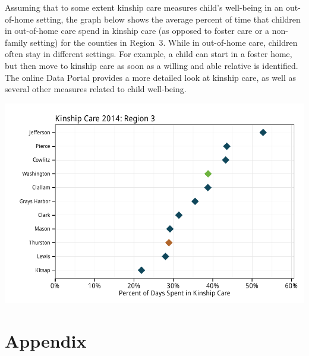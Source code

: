 \documentclass{article}\usepackage[]{graphicx}\usepackage[]{color}
\makeatletter
\def\maxwidth{ %
  \ifdim\Gin@nat@width>\linewidth
    \linewidth
  \else
    \Gin@nat@width
  \fi
}
\newenvironment{knitrout}{}{} %
\makeatother
\begin{document}
Assuming that to some extent kinship care measures child's well-being in an out-of-home setting, the graph below shows the average percent of time that children in out-of-home care spend in kinship care (as opposed to foster care or a non-family setting) for the counties in Region~3. While in out-of-home care, children often stay in different settings. For example, a child can start in a foster home, but then move to kinship care as soon as a willing and able relative is identified. The online Data Portal provides a more detailed look at kinship care, as well as several other measures related to child well-being.


\nopagebreak[3]
\begin{knitrout}
\color{fgcolor}

{\centering \includegraphics[width=\maxwidth]{figure/ooh_wb-1} 

}



\end{knitrout}
\vspace{-18pt}

\newpage

\section{Appendix}
\end{document}
